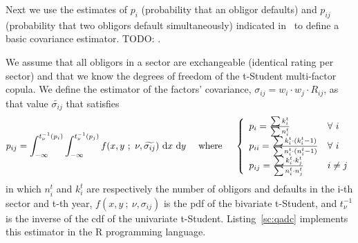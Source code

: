 \documentclass[11pt,fleqn]{book} %
\begin{document}
Next we use the estimates of $p_i$ (probability that an obligor defaults)
and $p_{ij}$ (probability that two obligors default simultaneously) indicated 
in~\cite{nagpal:2001} to define a basic covariance estimator. 
TODO: \cite[sec. 3.1]{castro:2007}.

\begin{definition}
	We assume that all obligors in a sector are exchangeable (identical rating 
	per sector) and that we know the degrees of freedom of the t-Student 
	multi-factor copula. We define the estimator of the factors' covariance, 
	$\sigma_{ij} = w_i \cdot w_j \cdot R_{ij}$, as that value 
	$\widetilde{\sigma_{ij}}$ that satisfies
	\begin{displaymath}
		p_{ij} = \displaystyle \int_{-\infty}^{t_{\nu}^{-1}(p_i)} \int_{-\infty}^{t_{\nu}^{-1}(p_j)} 
		f(x,y\ ;\ \nu, \widetilde{\sigma_{ij}}) \mathop{\,\mathrm{{}d}}\mathopen{} x \mathop{\,\mathrm{{}d}}\mathopen{} y
		\quad \text{ where } \quad
		\left\{
			\begin{array}{ll}
				p_i = \frac{\sum k_i^t}{\sum n_i^t} & \forall\ i \\
				p_{ii} = \frac{\sum k_i^t \cdot (k_i^t-1)}{\sum n_i^t \cdot (n_i^t-1)} & \forall\ i \\
				p_{ij} = \frac{\sum k_i^t \cdot k_j^t}{\sum n_i^t \cdot n_j^t} & i \ne j \\
			\end{array}
		\right.
	\end{displaymath}
	in which $n_i^t$ and $k_i^t$ are respectively the number of obligors and 
	defaults in the i-th sector and t-th year, $f(x,y\ ;\ \nu,\sigma_{ij})$ 
	is the pdf of the bivariate t-Student, and $t_{\nu}^{-1}$ is the inverse 
	of the cdf of the univariate t-Student. Listing~\ref{sc:qadc} implements 
	this estimator in the R programming language.
\end{definition}
\end{document}
